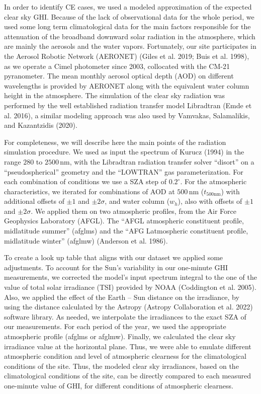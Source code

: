 \documentclass[
]{article}
\begin{document}
In order to identify CE cases, we used a modeled approximation of the expected clear
sky GHI. Because of the lack of observational data for the whole period, we used
some long term climatological data for the main factors responsible for the
attenuation of the broadband downward solar radiation in the atmosphere, which are
mainly the aerosols and the water vapors. Fortunately, our site participates in the
Aerosol Robotic Network (AERONET) (Giles et al. 2019; Buis et al. 1998), as we operate a Cimel
photometer since 2003, collocated with the CM-21 pyranometer. The mean monthly
aerosol optical depth (AOD) on different wavelengths is provided by AERONET along
with the equivalent water column height in the atmosphere. The simulation of the
clear sky radiation was performed by the well established radiation transfer model
Libradtran (Emde et al. 2016), a similar modeling approach was also used by Vamvakas, Salamalikis, and Kazantzidis (2020).

For completeness, we will describe here the main points of the radiation simulation
procedure. We used as input the spectrum of Kurucz (1994) in the range \(280\) to
\(2500\,\text{nm}\), with the Libradtran radiation transfer solver ``disort'' on a ``pseudospherical''
geometry and the ``LOWTRAN'' gas parameterization. For each combination of conditions
we use a SZA step of \(0.2^\circ\).
For the atmospheric characteristics, we iterated for combinations of AOD at
\(500\,\text{nm}\) (\(t_{500\text{nm}}\)) with additional offsets of \(\pm1\) and
\(\pm2\sigma\), and water column (\(w_h\)), also with offsets of \(\pm1\) and \(\pm2\sigma\).
We applied them on two atmospheric profiles, from the Air Force Geophysics
Laboratory (AFGL). The ``AFGL atmospheric constituent profile, midlatitude summer''
(afglms) and the ``AFG Latmospheric constituent profile, midlatitude winter'' (afglmw)
(Anderson et al. 1986).

To create a look up table that aligns with our dataset we applied some adjustments.
To account for the Sun's variability in our one-minute GHI measurements, we corrected
the model's input spectrum integral to the one of the value of total solar irradiance
(TSI) provided by NOAA (Coddington et al. 2005). Also, we applied the effect of the Earth
-- Sun distance on the irradiance, by using the distance calculated by the Astropy
(Astropy Collaboration et al. 2022) software library. As needed, we interpolate the
irradiances to the exact SZA of our measurements. For each period of the year, we
used the appropriate atmospheric profile (afglms or afglmw). Finally, we calculated
the clear sky irradiance value at the horizontal plane. Thus, we were able to
emulate different atmospheric condition and level of atmospheric clearness for the
climatological conditions of the site. Thus, the modeled clear sky irradiances,
based on the climatological conditions of the site, can be directly compared to each
measured one-minute value of GHI, for different conditions of atmospheric clearness.
\end{document}
